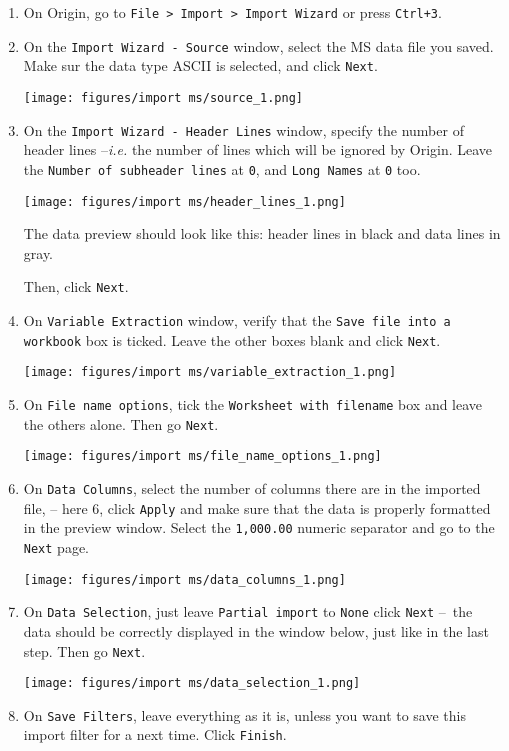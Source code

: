 \documentclass[a4paper, 11pt, raggedright, parskip]{tufte-style-article}
\begin{document}
\begin{enumerate}

\item On Origin, go to \texttt{File > Import > Import Wizard} or press \texttt{Ctrl+3}.

\item On the \texttt{Import Wizard - Source} window, select the MS data file you saved. Make sur the data type ASCII is selected, and click \texttt{Next}.

\texttt{[image: figures/import ms/source\_1.png]}

\item On the \texttt{Import Wizard - Header Lines} window, specify the number of header lines --\textit{i.e.} the number of lines which will be ignored by Origin. Leave the \texttt{Number of subheader lines} at \texttt{0}, and \texttt{Long Names} at \texttt{0} too.

\texttt{[image: figures/import ms/header\_lines\_1.png]}

The data preview should look like this: header lines in  black and data lines in gray.

Then, click \texttt{Next}.

\item On \texttt{Variable Extraction} window, verify that the \texttt{Save file into a workbook} box is ticked. Leave the other boxes blank and click \texttt{Next}. 

\texttt{[image: figures/import ms/variable\_extraction\_1.png]}

\item On \texttt{File name options}, tick the \texttt{Worksheet with filename} box and leave the others alone. Then go \texttt{Next}.

\texttt{[image: figures/import ms/file\_name\_options\_1.png]}

\item On \texttt{Data Columns}, select the number of columns there are in the imported file, -- here 6, click \texttt{Apply} and make sure that the data is properly formatted in the preview window. Select the \texttt{1,000.00} numeric separator and go to the \texttt{Next} page.

\texttt{[image: figures/import ms/data\_columns\_1.png]}

\item On \texttt{Data Selection}, just leave \texttt{Partial import} to \texttt{None} click \texttt{Next} --~the data should be correctly displayed in the window below, just like in the last step. Then go \texttt{Next}.

\texttt{[image: figures/import ms/data\_selection\_1.png]}

\item On \texttt{Save Filters}, leave everything as it is, unless you want to save this import filter for a next time. Click \texttt{Finish}.

\end{enumerate}
\end{document}
